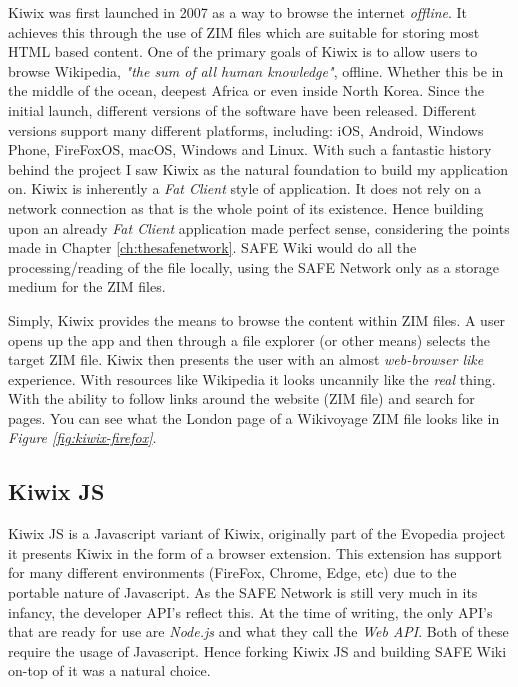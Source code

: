 \documentclass{l4proj}
\begin{document}
Kiwix was first launched in 2007 as a way to browse the internet \textit{offline}. It achieves this through the use of ZIM files which are suitable for storing most HTML based content. One of the primary goals of Kiwix is to allow users to browse Wikipedia, \textit{"the sum of all human knowledge"}, offline. Whether this be in the middle of the ocean, deepest Africa or even inside North Korea. Since the initial launch, different versions of the software have been released. Different versions support many different platforms, including: iOS, Android, Windows Phone, FireFoxOS, macOS, Windows and Linux. With such a fantastic history behind the project I saw Kiwix as the natural foundation to build my application on. Kiwix is inherently a \textit{Fat Client} style of application. It does not rely on a network connection as that is the whole point of its existence. Hence building upon an already \textit{Fat Client} application made perfect sense, considering the points made in Chapter \ref{ch:thesafenetwork}. SAFE Wiki would do all the processing/reading of the file locally, using the SAFE Network only as a storage medium for the ZIM files.

Simply, Kiwix provides the means to browse the content within ZIM files. A user opens up the app and then through a file explorer (or other means) selects the target ZIM file. Kiwix then presents the user with an almost \textit{web-browser like} experience. With resources like Wikipedia it looks uncannily like the \textit{real} thing. With the ability to follow links around the website (ZIM file) and search for pages. You can see what the London page of a Wikivoyage ZIM file looks like in \textit{Figure \ref{fig:kiwix-firefox}}.

\subsection{Kiwix JS}

Kiwix JS is a Javascript variant of Kiwix, originally part of the Evopedia project it presents Kiwix in the form of a browser extension. This extension has support for many different environments (FireFox, Chrome, Edge, etc) due to the portable nature of Javascript. As the SAFE Network is still very much in its infancy, the developer API's reflect this. At the time of writing, the only API's that are ready for use are \textit{Node.js} and what they call the \textit{Web API}. Both of these require the usage of Javascript. Hence forking Kiwix JS and building SAFE Wiki on-top of it was a natural choice.
\end{document}
